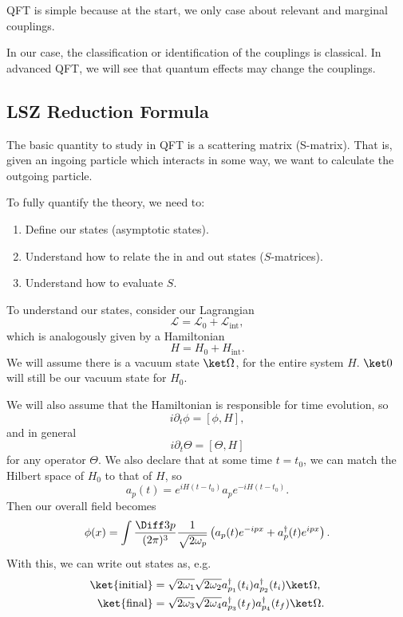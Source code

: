 \documentclass[12pt]{article}
\begin{document}
QFT is simple because at the start, we only case about relevant and marginal couplings.

In our case, the classification or identification of the couplings is classical. In advanced QFT, we will see that quantum effects may change the couplings.

\subsection{LSZ Reduction Formula}%
\label{sub:lsz}

The basic quantity to study in QFT is a scattering matrix (S-matrix). That is, given an ingoing particle which interacts in some way, we want to calculate the outgoing particle.

To fully quantify the theory, we need to:
\begin{enumerate}
	\item Define our states (asymptotic states).
	\item Understand how to relate the in and out states ($S$-matrices).
	\item Understand how to evaluate $S$.
\end{enumerate}

To understand our states, consider our Lagrangian
\[
\mathcal{L} = \mathcal{L}_0 + \mathcal{L}_{\mathrm{int}},
\]
which is analogously given by a Hamiltonian
\[
H = H_0 + H_{\mathrm{int}}.
\]
We will assume there is a vacuum state $\ket \Omega$, for the entire system $H$. $\ket 0$ will still be our vacuum state for $H_0$.


We will also assume that the Hamiltonian is responsible for time evolution, so
\[
	i \partial_t \phi = [\phi, H],
\]
and in general
\[
	i \partial_t \Theta = [\Theta, H]
\]
for any operator $\Theta$. We also declare that at some time $t = t_0$, we can match the Hilbert space of $H_0$ to that of $H$, so
\[
a_p(t) = e^{iH(t - t_0)} a_p e^{-iH(t - t_0)}.
\]
Then our overall field becomes
\[
	\phi(x) = \int \frac{\Diff 3 p}{(2 \pi)^3} \frac{1}{\sqrt{2 \omega_p}} \left( a_p(t) e^{-i p x} + a_p^{\dagger}(t) e^{ipx} \right).
\]
With this, we can write out states as, e.g.
\begin{align*}
	\ket{\text{initial}} &= \sqrt{2 \omega_1} \sqrt{2 \omega_2} a_{p_1}^{\dagger}(t_i) a_{p_2} ^{\dagger}(t_i) \ket \Omega, \\
	\ket{\text{final}} &= \sqrt{2\omega_3}\sqrt{2\omega_4} a_{p_3}^{\dagger}(t_f) a_{p_4}^{\dagger} (t_f) \ket \Omega.
\end{align*}
\end{document}
